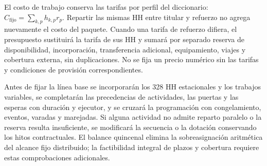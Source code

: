 El costo de trabajo conserva las tarifas por perfil del diccionario: $C_{\mathrm{fijo}}=\sum_{k,p}h_{k,p}r_p$. Repartir las mismas HH entre titular y refuerzo no agrega nuevamente el costo del paquete. Cuando una tarifa de refuerzo difiera, el presupuesto sustituirá la tarifa de sus HH y sumará por separado reserva de disponibilidad, incorporación, transferencia adicional, equipamiento, viajes y cobertura externa, sin duplicaciones. No se fija un precio numérico sin las tarifas y condiciones de provisión correspondientes.

Antes de fijar la línea base se incorporarán los 328 HH estacionales y los trabajos variables, se completarán las precedencias de actividades, las puertas y las esperas con duración y ejecutor, y se cruzará la programación con congelamiento, eventos, varadas y marejadas. Si alguna actividad no admite reparto paralelo o la reserva resulta insuficiente, se modificará la secuencia o la dotación conservando los hitos contractuales. El balance quincenal elimina la sobreasignación aritmética del alcance fijo distribuido; la factibilidad integral de plazos y cobertura requiere estas comprobaciones adicionales.
